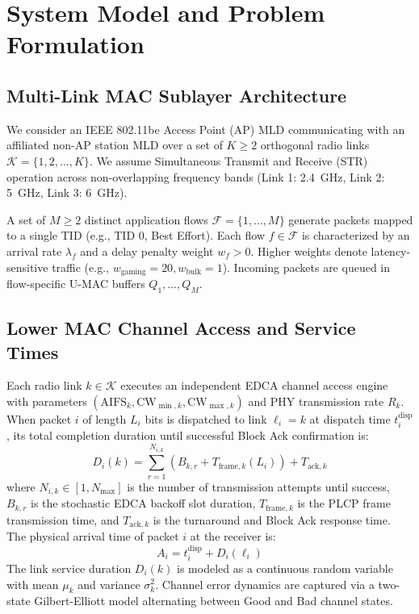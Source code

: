 \documentclass[10pt,journal,compsoc]{IEEEtran}
\begin{document}
\section{System Model and Problem Formulation}
\label{sec:system_model}

\subsection{Multi-Link MAC Sublayer Architecture}
We consider an IEEE 802.11be Access Point (AP) MLD communicating with an affiliated non-AP station MLD over a set of $K \ge 2$ orthogonal radio links $\mathcal{K} = \{1, 2, \dots, K\}$. We assume Simultaneous Transmit and Receive (STR) operation across non-overlapping frequency bands (Link 1: 2.4~GHz, Link 2: 5~GHz, Link 3: 6~GHz).

A set of $M \ge 2$ distinct application flows $\mathcal{F} = \{1, \dots, M\}$ generate packets mapped to a single TID (e.g., TID 0, Best Effort). Each flow $f \in \mathcal{F}$ is characterized by an arrival rate $\lambda_f$ and a delay penalty weight $w_f > 0$. Higher weights denote latency-sensitive traffic (e.g., $w_{\text{gaming}} = 20, w_{\text{bulk}} = 1$). Incoming packets are queued in flow-specific U-MAC buffers $Q_1, \dots, Q_M$.

\subsection{Lower MAC Channel Access and Service Times}
Each radio link $k \in \mathcal{K}$ executes an independent EDCA channel access engine with parameters $(\text{AIFS}_k, \text{CW}_{\min, k}, \text{CW}_{\max, k})$ and PHY transmission rate $R_k$. When packet $i$ of length $L_i$ bits is dispatched to link $\ell_i = k$ at dispatch time $t_i^{\text{disp}}$, its total completion duration until successful Block Ack confirmation is:
\begin{equation}
    D_i(k) = \sum_{r=1}^{N_{i, k}} \left( B_{k, r} + T_{\text{frame}, k}(L_i) \right) + T_{\text{ack}, k}
\end{equation}
where $N_{i, k} \in [1, N_{\max}]$ is the number of transmission attempts until success, $B_{k, r}$ is the stochastic EDCA backoff slot duration, $T_{\text{frame}, k}$ is the PLCP frame transmission time, and $T_{\text{ack}, k}$ is the turnaround and Block Ack response time. The physical arrival time of packet $i$ at the receiver is:
\begin{equation}
    A_i = t_i^{\text{disp}} + D_i(\ell_i)
\end{equation}
The link service duration $D_i(k)$ is modeled as a continuous random variable with mean $\mu_k$ and variance $\sigma_k^2$. Channel error dynamics are captured via a two-state Gilbert-Elliott model alternating between Good and Bad channel states.
\end{document}
